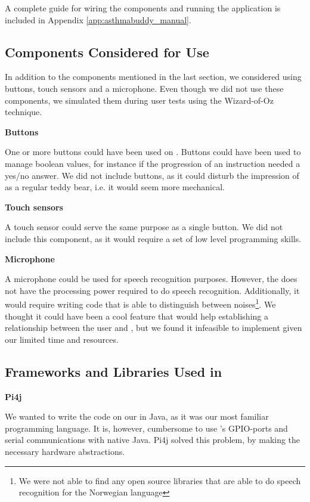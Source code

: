 A complete guide for wiring the components and running the application is included in Appendix \ref{app:asthmabuddy_manual}.

\subsection{Components Considered for Use}
\label{sec:componentsconsidered}
In addition to the components mentioned in the last section, we considered using buttons, touch sensors and a microphone. Even though we did not use these components, we simulated them during user tests using the Wizard-of-Oz technique. 

\textbf{Buttons}

One or more buttons could have been used on \ab{}. Buttons could have been used to manage boolean values, for instance if the progression of an instruction needed a yes/no answer. We did not include buttons, as it could disturb the impression of \ab{} as a regular teddy bear, i.e. it would seem more mechanical. 

\textbf{Touch sensors}

A touch sensor could serve the same purpose as a single button. We did not include this component, as it would require a set of low level programming skills. 

\textbf{Microphone}

A microphone could be used for speech recognition purposes. However, the \rpi{} does not have the processing power required to do speech recognition. Additionally, it would require writing code that is able to distinguish between noises\footnote{We were not able to find any open source libraries that are able to do speech recognition for the Norwegian language}. We thought it could have been a cool feature that would help establishing a relationship between the user and \ab{}, but we found it infeasible to implement given our limited time and resources.    

\subsection{Frameworks and Libraries Used in \ab{}} 

\textbf{Pi4j}

We wanted to write the code on our \rpi{} in Java, as it was our most familiar programming language. It is, however, cumbersome to use \rpi{}'s GPIO-ports and serial communications with native Java. Pi4j solved this problem, by making the necessary hardware abstractions.


